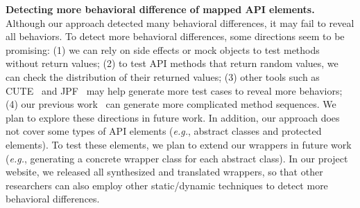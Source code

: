 \textbf{Detecting more behavioral difference of mapped API elements.} Although our approach detected many behavioral differences, it may fail to reveal all behaviors. To detect more behavioral differences, some directions seem to be promising: (1) we can rely on side effects or  mock objects to test methods without return values; (2) to test API methods that return random values, we can check the distribution of their returned values; (3) other tools such as CUTE~\cite{koushik:cute} and JPF~\cite{visser2003mcp} may help generate more test cases to reveal more behaviors; (4) our previous work~\cite{thummalapenta09:mseqgen} can generate more complicated method sequences. We plan to explore these directions in future work. In addition, our approach does not cover some types of API elements (\emph{e.g.}, abstract classes and protected elements). To test these elements, we plan to extend our wrappers in future work (\emph{e.g.}, generating a concrete wrapper class for each abstract class). In our project website, we released all synthesized and translated wrappers, so that other researchers can also employ other static/dynamic techniques to detect more behavioral differences.



